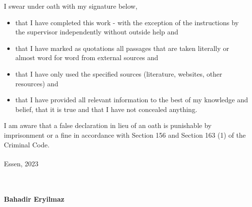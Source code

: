 I swear under oath with my signature below,
\begin{itemize}
    \item that I have completed this work - with the exception of the instructions by the supervisor independently without outside help and
    \item that I have marked as quotations all passages that are taken literally or almost word for word from external sources and
    \item that I have only used the specified sources (literature, websites, other resources) and
    \item that I have provided all relevant information to the best of my knowledge and belief, that it is true and that I have not concealed anything.
\end{itemize}
I am aware that a false declaration in lieu of an oath is punishable by imprisonment or a fine in accordance with Section 156 and Section 163 (1) of the Criminal Code.
\\
\\
\noindent Essen, 2023
\\
\\
\begin{flushleft}
\\
\textbf{Bahadir Eryilmaz}
\end{flushleft}

\vfill %
\clearpage
